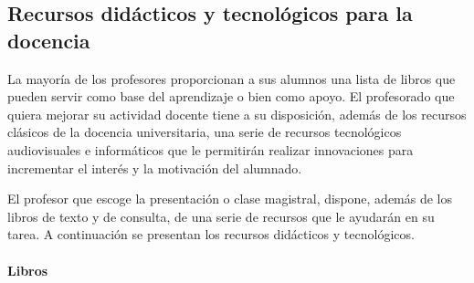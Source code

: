 \subsection{Recursos didácticos y tecnológicos para la docencia} \label{sec:recursos}

La mayoría de los profesores proporcionan a sus alumnos una lista de libros que pueden servir como base del aprendizaje o bien como apoyo. El profesorado que quiera mejorar su actividad docente tiene a su disposición, además de los recursos clásicos de la docencia universitaria, una serie de recursos tecnológicos audiovisuales e informáticos que le permitirán realizar innovaciones para incrementar el interés y la motivación del alumnado.

El profesor que escoge la presentación o clase magistral, dispone, además de los libros de texto y de consulta, de una serie de recursos que le ayudarán en su tarea. A continuación se presentan los recursos didácticos y tecnológicos.

\paragraph{Libros\\\\}

